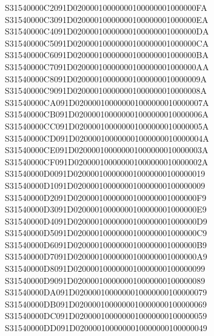 \documentclass[12pt,a4paper]{article}
\begin{document}
\begin{framed}
{S31540000C2091D02000010000000100000001000000FA\newline
S31540000C3091D02000010000000100000001000000EA\newline
S31540000C4091D02000010000000100000001000000DA\newline
S31540000C5091D02000010000000100000001000000CA\newline
S31540000C6091D02000010000000100000001000000BA\newline
S31540000C7091D02000010000000100000001000000AA\newline
S31540000C8091D020000100000001000000010000009A\newline
S31540000C9091D020000100000001000000010000008A\newline
S31540000CA091D020000100000001000000010000007A\newline
S31540000CB091D020000100000001000000010000006A\newline
S31540000CC091D020000100000001000000010000005A\newline
S31540000CD091D020000100000001000000010000004A\newline
S31540000CE091D020000100000001000000010000003A\newline
S31540000CF091D020000100000001000000010000002A\newline
S31540000D0091D0200001000000010000000100000019\newline
S31540000D1091D0200001000000010000000100000009\newline
S31540000D2091D02000010000000100000001000000F9\newline
S31540000D3091D02000010000000100000001000000E9\newline
S31540000D4091D02000010000000100000001000000D9\newline
S31540000D5091D02000010000000100000001000000C9\newline
S31540000D6091D02000010000000100000001000000B9\newline
S31540000D7091D02000010000000100000001000000A9\newline
S31540000D8091D0200001000000010000000100000099\newline
S31540000D9091D0200001000000010000000100000089\newline
S31540000DA091D0200001000000010000000100000079\newline
S31540000DB091D0200001000000010000000100000069\newline
S31540000DC091D0200001000000010000000100000059\newline
S31540000DD091D0200001000000010000000100000049\newline
}
\end{framed}
\end{document}
